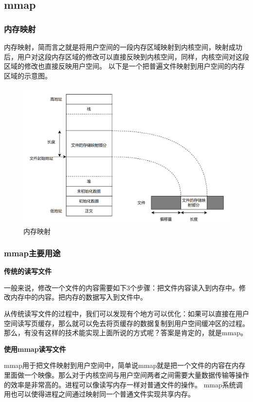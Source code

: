 \subsection{mmap}
\subsubsection{内存映射}
内存映射，简而言之就是将用户空间的一段内存区域映射到内核空间，映射成功后，用户对这段内存区域的修改可以直接反映到内核空间，同样，内核空间对这段区域的修改也直接反映用户空间。
以下是一个把普遍文件映射到用户空间的内存区域的示意图。

\begin{figure}[H]
    \centering
    \caption[short]{内存映射}
    \includegraphics[width=0.8\linewidth]{figures/09-04-mmap-内存映射.png}
\end{figure}

\subsubsection{mmap主要用途}
\textbf{传统的读写文件}

一般来说，修改一个文件的内容需要如下3个步骤：把文件内容读入到内存中。修改内存中的内容。把内存的数据写入到文件中。

从传统读写文件的过程中，我们可以发现有个地方可以优化：如果可以直接在用户空间读写页缓存，那么就可以免去将页缓存的数据复制到用户空间缓冲区的过程。
那么，有没有这样的技术能实现上面所说的方式呢？答案是肯定的，就是mmap。

\textbf{使用mmap读写文件}

mmap用于把文件映射到用户空间中，简单说mmap就是把一个文件的内容在内存里面做一个映像。那么对于内核空间与用户空间两者之间需要大量数据传输等操作的效率是非常高的。进程可以像读写内存一样对普通文件的操作。
mmap系统调用也可以使得进程之间通过映射同一个普通文件实现共享内存。

